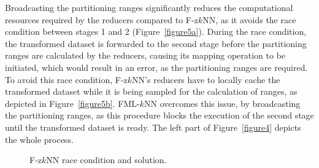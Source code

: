 Broadcasting the partitioning ranges significantly reduces the computational resources required by the reducers compared to F-z$k$NN, as it avoids the race condition between stages 1 and 2 (Figure~\ref{figure5a}). During the race condition, the transformed dataset is forwarded to the second stage before the partitioning ranges are calculated by the reducers, causing its mapping operation to be initiated, which would result in an error, as the partitioning ranges are required. To avoid this race condition, F-z$k$NN's reducers have to locally cache the transformed dataset while it is being sampled for the calculation of ranges, as depicted in Figure~\ref{figure5b}. FML-$k$NN overcomes this issue, by broadcasting the partitioning ranges, as this procedure blocks the execution of the second stage until the transformed dataset is ready. The left part of Figure~\ref{figure4} depicts the whole process.

\begin{figure}[!tb]
	\centering
	\caption{F-z$k$NN race condition and solution.}
	\label{figure5}
\end{figure}

